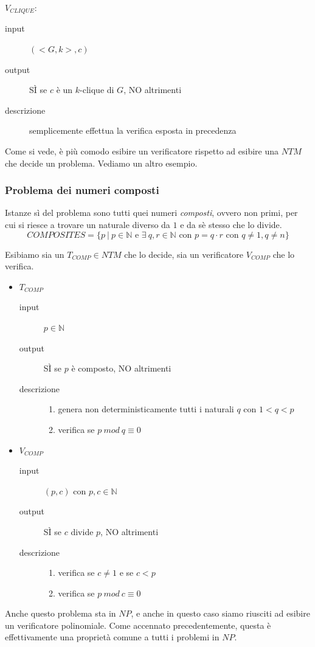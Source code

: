 $V_{CLIQUE}$:
\begin{description}
	\item[input] $(<G, k>, c)$
	\item[output] SÌ se $c$ è un $k$-clique di $G$, NO altrimenti
	\item[descrizione] semplicemente effettua la verifica esposta in precedenza
\end{description}

Come si vede, è più comodo esibire un verificatore rispetto ad esibire una $NTM$ che decide un problema. Vediamo un altro esempio.

\subsubsection{Problema dei numeri composti}
Istanze sì del problema sono tutti quei numeri \emph{composti}, ovvero non primi, per cui si riesce a trovare un naturale diverso da $1$ e da sè stesso che lo divide.
\[
	COMPOSITES = \{ p \ | \ p \in \mathbb{N} \text{ e } \exists \ q, r \in \mathbb{N} \text{ con } p = q \cdot r \text{ con } q \neq 1, q \neq n\}
\]

Esibiamo sia un $T_{COMP} \in NTM$ che lo decide, sia un verificatore $V_{COMP}$ che lo verifica.
\begin{itemize}
	\item $T_{COMP}$
	\begin{description}
		\item[input] $p \in \mathbb{N}$
		\item[output] SÌ se $p$ è composto, NO altrimenti
		\item[descrizione]
		\begin{enumerate}
			\item genera non deterministicamente tutti i naturali $q$ con $1 < q < p$

			\item verifica se $p \ mod \ q \equiv 0$
		\end{enumerate}
	\end{description}

	\item $V_{COMP}$
	\begin{description}
		\item[input] $(p, c)$ con $p, c \in \mathbb{N} $
		\item[output] SÌ se $c$ divide $p$, NO altrimenti
		\item[descrizione]
		\begin{enumerate}
			\item verifica se $c \neq 1$ e se $c < p$
			\item verifica se $p \ mod \ c \equiv 0$
		\end{enumerate}
		
	\end{description}
\end{itemize}
Anche questo problema sta in $NP$, e anche in questo caso siamo riusciti ad esibire un verificatore polinomiale. Come accennato precedentemente, questa è effettivamente una proprietà comune a tutti i problemi in $NP$.

